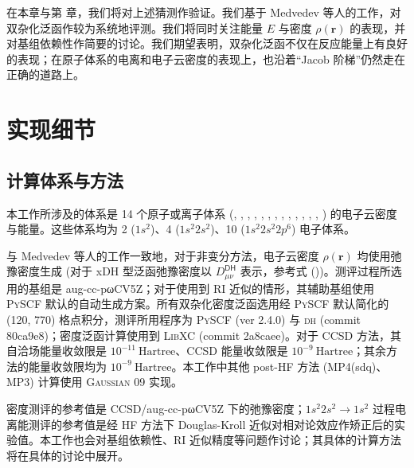 在本章与第  章，我们将对上述猜测作验证。我们基于 Medvedev 等人的工作\cite{Medvedev-Lyssenko.S.2017}，对双杂化泛函作较为系统地评测。我们将同时关注能量 $E$ 与密度 $\rho(\bm{r})$ 的表现，并对基组依赖性作简要的讨论。我们期望表明，双杂化泛函不仅在反应能量上有良好的表现\cite{Su-Xu.WCMS.2016, Goerigk-Grimme.PCCP.2017, Zhang-Xu.JPCL.2021, Santra-Martin.JPCL.2021}；在原子体系的电离和电子云密度的表现上，也沿着“Jacob 阶梯”仍然走在正确的道路上。

\section{实现细节}

\subsection{计算体系与方法}

本工作所涉及的体系是 14 个原子或离子体系 (, , , , , , , , , , , , , ) 的电子云密度与能量。这些体系均为 2 ($1s^2$)、4 ($1s^2 2s^2$)、10 ($1s^2 2s^2 2p^6$) 电子体系。

与 Medvedev 等人的工作\cite{Medvedev-Lyssenko.S.2017}一致地，对于非变分方法，电子云密度 $\rho (\bm{r})$ 均使用弛豫密度生成 (对于 xDH 型泛函弛豫密度以 $D_{\mu \nu}^\textsf{DH}$ 表示，参考式 ())。测评过程所选用的基组是 aug-cc-pωCV5Z；对于使用到 RI 近似的情形，其辅助基组使用 \textsc{PySCF} 默认的自动生成方案。所有双杂化密度泛函选用经 \textsc{PySCF} 默认简化的 (120, 770) 格点积分，测评所用程序为 \textsc{PySCF} (ver 2.4.0) 与 \textsc{dh} (commit 80ca9e8)；密度泛函计算使用到 \textsc{LibXC} (commit 2a8caee)。对于 CCSD 方法，其自洽场能量收敛限是 $10^{-11} \ \text{Hartree}$、CCSD 能量收敛限是 $10^{-9} \ \text{Hartree}$；其余方法的能量收敛限均为 $10^{-9} \ \text{Hartree}$。本工作中其他 post-HF 方法 (MP4(sdq)、MP3) 计算使用 \textsc{Gaussian 09} 实现\cite{Su-Xu.PNAS.2018}。

密度测评的参考值是 CCSD/aug-cc-pωCV5Z 下的弛豫密度；$1s^2 2s^2 \rightarrow 1s^2$ 过程电离能测评的参考值是经 HF 方法下 Douglas-Kroll 近似对相对论效应作矫正后的实验值\cite{Kepp-Kepp.S.2017, Douglas-Kroll.APY.1974, NIST.Atomic}。本工作也会对基组依赖性、RI 近似精度等问题作讨论；其具体的计算方法将在具体的讨论中展开。

